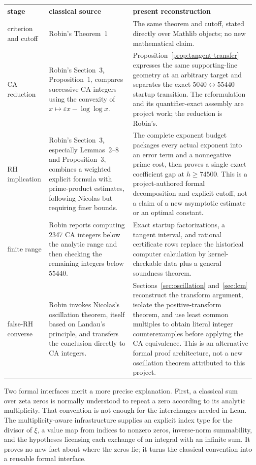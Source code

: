 \documentclass[11pt]{amsart}
\theoremstyle{definition}
\theoremstyle{remark}
\numberwithin{equation}{section}
\newcommand{\eps}{\varepsilon}
\begin{document}
\begin{center}
\small
\begin{tabular}{@{}>{\raggedright\arraybackslash}p{}
  >{\raggedright\arraybackslash}p{}
  >{\raggedright\arraybackslash}p{}@{}}
\toprule
stage & classical source & present reconstruction \tabularnewline
\midrule
criterion and cutoff
& Robin's Theorem~1~\cite{Robin1984}
& The same theorem and cutoff, stated directly over Mathlib objects; no new
  mathematical claim. \tabularnewline
CA reduction
& Robin's Section~3, Proposition~1, compares successive CA integers using the
  convexity of $x\mapsto\eps x-\log\log x$.
& Proposition~\ref{prop:tangent-transfer} expresses the same supporting-line
  geometry at an arbitrary target and separates the exact
  $5040\leftrightarrow55440$ startup transition.  The reformulation and its
  quantifier-exact assembly are project work; the reduction is Robin's.
  \tabularnewline
RH implication
& Robin's Section~3, especially Lemmas~2--8 and Proposition~3, combines a
  weighted explicit formula with prime-product estimates, following Nicolas
  but requiring finer bounds.
& The complete exponent budget packages every actual exponent into an error
  term and a nonnegative prime cost, then proves a single exact coefficient
  gap at $h\ge74500$.  This is a project-authored formal decomposition and
  explicit cutoff, not a claim of a new asymptotic estimate or an optimal
  constant. \tabularnewline
finite range
& Robin reports computing 2347 CA integers below the analytic range and then
  checking the remaining integers below $55440$.
& Exact startup factorizations, a tangent interval, and rational certificate
  rows replace the historical computer calculation by kernel-checkable data
  plus a general soundness theorem. \tabularnewline
false-RH converse
& Robin invokes Nicolas's oscillation theorem, itself based on Landau's
  principle, and transfers the conclusion directly to CA integers.
& Sections~\ref{sec:oscillation} and~\ref{sec:lcm} reconstruct the transform
  argument, isolate the positive-transform theorem, and use least common
  multiples to obtain literal integer counterexamples before applying the CA
  equivalence.  This is an alternative formal proof architecture, not a new
  oscillation theorem attributed to this project. \tabularnewline
\bottomrule
\end{tabular}
\end{center}

Two formal interfaces merit a more precise explanation.  First, a classical
sum over zeta zeros is normally understood to repeat a zero according to its
analytic multiplicity.  That convention is not enough for the interchanges
needed in Lean.  The multiplicity-aware infrastructure supplies an explicit
index type for the divisor of $\xi$, a value map from indices to nonzero zeros,
inverse-norm summability, and the hypotheses licensing each exchange of an
integral with an infinite sum.  It proves no new fact about where the zeros
lie; it turns the classical convention into a reusable formal interface.
\end{document}
